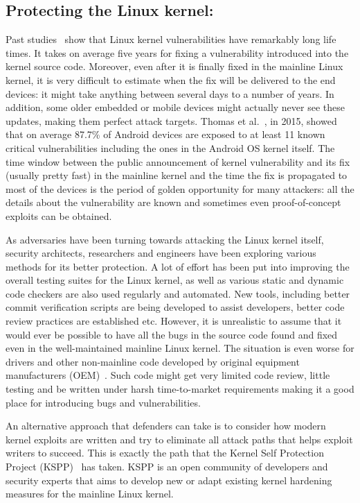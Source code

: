 \subsection*{Protecting the Linux kernel:}

Past studies~\cite{stoep2016android, cooklss2016} show that Linux kernel vulnerabilities have remarkably long life times. It takes on average five years for fixing a vulnerability introduced into the kernel source code. Moreover, even after it is finally fixed in the mainline Linux kernel, it is very difficult to estimate when the fix will be delivered to the end devices: it might take anything between several days to a number of years. In addition, some older embedded or mobile devices might actually never see these updates, making them perfect attack targets. Thomas et al.~\cite{Thomas2015}, in 2015, showed that on average 87.7\% of Android devices are exposed to at least 11 known critical vulnerabilities including the ones in the Android OS kernel itself. The time window between the public announcement of kernel vulnerability and its fix (usually pretty fast) in the mainline kernel and the time the fix is propagated to most of the devices is the period of golden opportunity for many attackers: all the details about the vulnerability are known and sometimes even proof-of-concept exploits can be obtained.

As adversaries have been turning towards attacking the Linux kernel itself, security architects, researchers and engineers have been exploring various methods for its better protection. A lot of effort has been put into improving the overall testing suites for the Linux kernel, as well as various static and dynamic code checkers are also used regularly and automated. New tools, including better commit verification scripts are being developed to assist developers, better code review practices are established etc. However, it is unrealistic to assume that it would ever be possible to have all the bugs in the source code found and fixed even in the well-maintained mainline Linux kernel. The situation is even worse for drivers and other non-mainline code developed by original equipment manufacturers (OEM)~\cite{stoep2016android}. Such code might get very limited code review, little testing and be written under harsh time-to-market requirements making it a good place for introducing bugs and vulnerabilities.

An alternative approach that defenders can take is to consider how modern kernel exploits are written and try to eliminate all attack paths that helps exploit writers to succeed. This is exactly the path that the Kernel Self Protection Project (KSPP)~\cite{kspp} has taken. KSPP is an open community of developers and security experts that aims to develop new or adapt existing kernel hardening measures for the mainline Linux kernel. 

